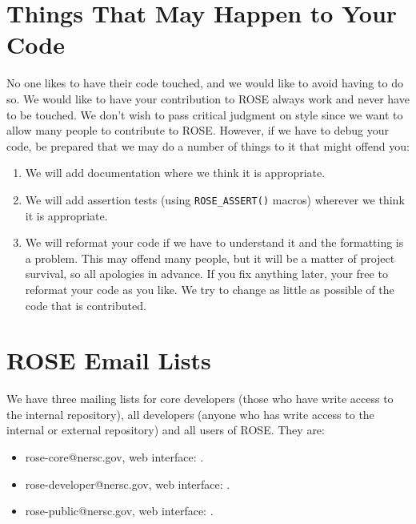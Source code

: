 
\section{Things That May Happen to Your Code}%

    No one likes to have their code touched, and we would like to
avoid having to do so. We would like to have your contribution to ROSE
always work and never have to be touched.  We don't wish to pass
critical judgment on style since we want to allow many people to 
contribute to ROSE.  However, if we have to debug your code, be prepared 
that we may do a number of things to it that might offend you:
\begin{enumerate}
   \item We will add documentation where we think it is appropriate.
   \item We will add assertion tests (using {\tt ROSE\_ASSERT()} macros)
         wherever we think it is appropriate.
   \item We will reformat your code if we have to understand it and the 
         formatting is a problem.  This may offend
         many people, but it will be a matter of project survival,
         so all apologies in advance.  If you fix
         anything later, your free to reformat your code as you like.  We try to change
         as little as possible of the code that is contributed.
\end{enumerate}

\section{ROSE Email Lists}%
\label{rose_email_list_info}
   We have three mailing lists for core developers (those who have write access to
the internal repository), all developers (anyone who has write access to the
internal or external repository) and all
users of ROSE. They are:
\begin{itemize}
\item rose-core@nersc.gov, web interface: 
.
\item rose-developer@nersc.gov, web interface: 
.
\item rose-public@nersc.gov, web interface:
.
\end{itemize}


